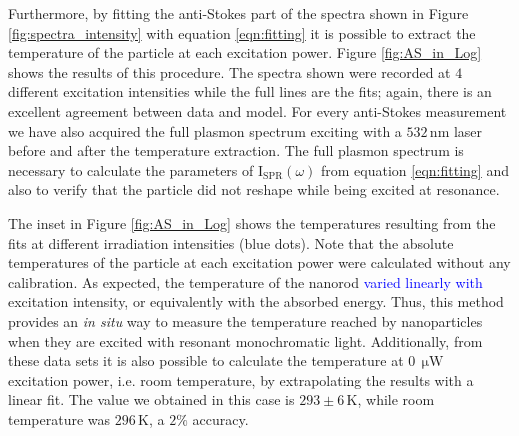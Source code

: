 \documentclass[journal=nalefd,manuscript=letter]{achemso}
\newcommand{\HI}[1]{\textcolor{blue}{#1}} %
\newcommand{\K}{\ensuremath{\,\textrm{K}}}
\newcommand{\nm}{\ensuremath{\,\textrm{nm}}}
\newcommand{\uW}{\ensuremath{\,\upmu\textrm{W}}}
\begin{document}
Furthermore, by fitting the anti-Stokes part of the spectra shown in Figure
\ref{fig:spectra_intensity} with equation \ref{eqn:fitting} it is possible to extract
the temperature of the particle at each excitation power. Figure
\ref{fig:AS_in_Log} shows the results of this procedure. The spectra shown were
recorded at $4$ different excitation intensities while the full lines are the
fits; again, there is an excellent agreement between data and model. For every
anti-Stokes measurement we have also acquired the full plasmon spectrum 
exciting with a $532\nm$ laser before and after the temperature extraction.
The full plasmon spectrum is necessary to calculate the parameters of
$\textrm{I}_\textrm{SPR}(\omega)$ from equation \ref{eqn:fitting} and also to verify that the
particle did not reshape while being excited at resonance. 

The inset in Figure \ref{fig:AS_in_Log} shows the temperatures resulting from
the fits at different irradiation intensities (blue dots). Note
that the absolute temperatures of the particle at each excitation power were
calculated without any calibration. As expected, the temperature of the nanorod
\HI{varied linearly with} excitation intensity, or equivalently with the absorbed
energy. Thus, this method provides an \textit{in situ} way to measure the
temperature reached by nanoparticles when they are excited with resonant
monochromatic light. Additionally, from these data sets it  is also possible to
calculate the temperature at $0\uW$ excitation power, i.e. room temperature, by
extrapolating the results with a linear fit. The value we obtained in this case
is $293\pm 6 \K$, while room temperature was $296\K$, a $2\%$ accuracy.
\end{document}
